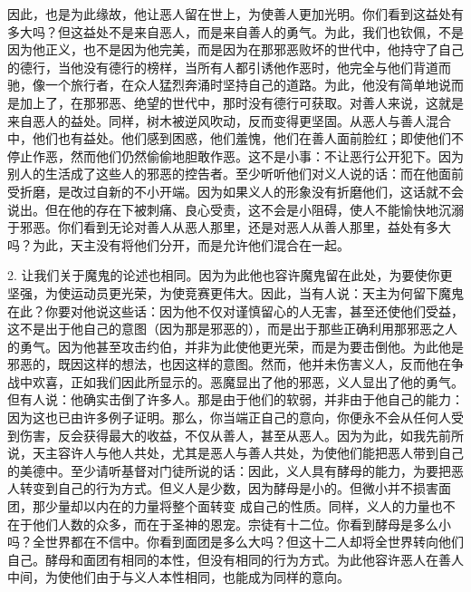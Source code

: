 因此，也是为此缘故，他让恶人留在世上，为使善人更加光明。你们看到这益处有多大吗？但这益处不是来自恶人，而是来自善人的勇气。为此，我们也钦佩，不是因为他正义，也不是因为他完美，而是因为在那邪恶败坏的世代中，他持守了自己的德行，当他没有德行的榜样，当所有人都引诱他作恶时，他完全与他们背道而驰，像一个旅行者，在众人猛烈奔涌时坚持自己的道路。为此，他没有简单地说而是加上了，在那邪恶、绝望的世代中，那时没有德行可获取。对善人来说，这就是来自恶人的益处。同样，树木被逆风吹动，反而变得更坚固。从恶人与善人混合中，他们也有益处。他们感到困惑，他们羞愧，他们在善人面前脸红；即使他们不停止作恶，然而他们仍然偷偷地胆敢作恶。这不是小事：不让恶行公开犯下。因为别人的生活成了这些人的邪恶的控告者。至少听听他们对义人说的话：而在他面前受折磨，是改过自新的不小开端。因为如果义人的形象没有折磨他们，这话就不会说出。但在他的存在下被刺痛、良心受责，这不会是小阻碍，使人不能愉快地沉溺于邪恶。你们看到无论对善人从恶人那里，还是对恶人从善人那里，益处有多大吗？为此，天主没有将他们分开，而是允许他们混合在一起。\par

2. 让我们关于魔鬼的论述也相同。因为为此他也容许魔鬼留在此处，为要使你更坚强，为使运动员更光荣，为使竞赛更伟大。因此，当有人说：天主为何留下魔鬼在此？你要对他说这些话：因为他不仅对谨慎留心的人无害，甚至还使他们受益，这不是出于他自己的意图（因为那是邪恶的），而是出于那些正确利用那邪恶之人的勇气。因为他甚至攻击约伯，并非为此使他更光荣，而是为要击倒他。为此他是邪恶的，既因这样的想法，也因这样的意图。然而，他并未伤害义人，反而他在争战中欢喜，正如我们因此所显示的。恶魔显出了他的邪恶，义人显出了他的勇气。但有人说：他确实击倒了许多人。那是由于他们的软弱，并非由于他自己的能力：因为这也已由许多例子证明。那么，你当端正自己的意向，你便永不会从任何人受到伤害，反会获得最大的收益，不仅从善人，甚至从恶人。因为为此，如我先前所说，天主容许人与他人共处，尤其是恶人与善人共处，为使他们能把恶人带到自己的美德中。至少请听基督对门徒所说的话：因此，义人具有酵母的能力，为要把恶人转变到自己的行为方式。但义人是少数，因为酵母是小的。但微小并不损害面团，那少量却以内在的力量将整个面转变 成自己的性质。同样，义人的力量也不在于他们人数的众多，而在于圣神的恩宠。宗徒有十二位。你看到酵母是多么小吗？全世界都在不信中。你看到面团是多么大吗？但这十二人却将全世界转向他们自己。酵母和面团有相同的本性，但没有相同的行为方式。为此他容许恶人在善人中间，为使他们由于与义人本性相同，也能成为同样的意向。\par

